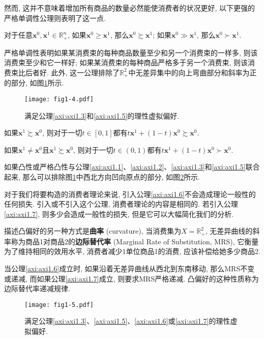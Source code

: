 \documentclass[cn, 12pt, math=mtpro2, bibstyle=apa, blue]{elegantbook}
\newcommand{\R}{\mathbb{R}}
\newcommand{\x}{\mathbf{x}}
\begin{document}
然而, 这并不意味着增加所有商品的数量必然能使消费者的状况更好, 以下更强的严格单调性公理则表明了这一点.

\begin{axiom}[严格单调性]\label{axi:axi1.5}
对于任意$\x^0,\x^1\in\R^n_+$, 如果$\x^0\ge\x^1$, 那么$\x^0\succsim \x^1$; 如果$\x^0\gg\x^1$, 那么$\x^0\succ\x^1$.
\end{axiom}
严格单调性表明如果某消费束的每种商品数量至少和另一个消费束的一样多, 则该消费束至少和它一样好; 如果某消费束的每种商品严格多于另一个消费束, 则该消费束比后者好. 此外, 这一公理排除了$\R^2_+$中无差异集中的向上弯曲部分和斜率为正的部分, 如图\ref{fig1.4}所示.

\begin{figure}
  \centering
  \texttt{[image: fig1-4.pdf]}
  \caption{满足公理\ref{axi:axi1.3}和\ref{axi:axi1.5}的理性虚拟偏好.}\label{fig1.4}
\end{figure}

\begin{axiom}[凸性]\label{axi:axi1.6}
如果$\x^1\succsim\x^0$, 则对于一切$t\in[0,1]$都有$t\x^1+(1-t)\x^0\succsim\x^0$.
\end{axiom}
\begin{axiom}[严格凸性]\label{axi:axi1.7}
如果$\x^1\ne\x^0$且$\x^1\succsim\x^0$, 则对于一切$t\in(0,1)$都有$t\x^1+(1-t)\x^0\succ\x^0$.
\end{axiom}

如果凸性或严格凸性与公理\ref{axi:axi1.1}、\ref{axi:axi1.2}、\ref{axi:axi1.3}和\ref{axi:axi1.5}联合起来, 那么可以排除图\ref{fig1.4}中西北方向凹向原点的部分, 如图\ref{fig1.5}所示.

对于我们将要构造的消费者理论来说, 引入公理\ref{axi:axi1.6}不会造成理论一般性的任何损失. 引入或不引入这个公理, 消费者理论的内容是相同的. 若引入公理\ref{axi:axi1.7}, 则多少会造成一般性的损失, 但是它可以大幅简化我们的分析.

描述凸偏好的另一种方式是\textbf{曲率} (curvature), 当消费集为$X=\R^2_+$, 无差异曲线的斜率称为商品1对商品2的\textbf{边际替代率} (Marginal Rate of Substitution, MRS), 它衡量为了维持相同的效用水平, 消费者减少1单位商品1的消费, 应该补偿给她多少商品2.

当公理\ref{axi:axi1.6}成立时, 如果沿着无差异曲线从西北到东南移动, 那么MRS不变或递减, 而如果公理\ref{axi:axi1.7}成立, 则要求MRS严格递减. 凸偏好的这种性质称为边际替代率递减规律.
\begin{figure}
  \centering
  \texttt{[image: fig1-5.pdf]}
  \caption{满足公理\ref{axi:axi1.3}、\ref{axi:axi1.5}、\ref{axi:axi1.6}或\ref{axi:axi1.7}的理性虚拟偏好.}\label{fig1.5}
\end{figure}
\end{document}
